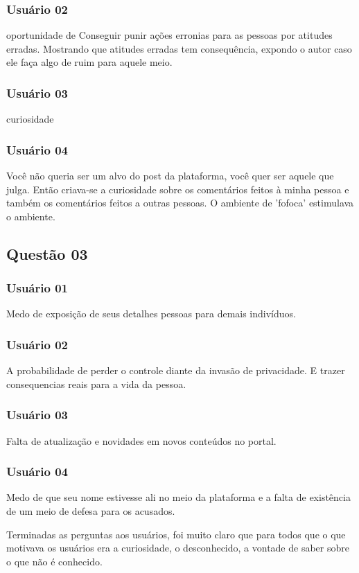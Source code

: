 \subsubsection{Usuário 02}
oportunidade de Conseguir punir ações erronias para as pessoas por atitudes erradas.
Mostrando que atitudes erradas tem consequência, expondo o autor caso ele faça
algo de ruim para aquele meio.
\subsubsection{Usuário 03}
curiosidade
\subsubsection{Usuário 04}
Você não queria ser um alvo do post da plataforma, você quer ser aquele que julga.
Então criava-se a curiosidade sobre os comentários feitos à minha pessoa e também
os comentários feitos a outras pessoas. O ambiente de 'fofoca' estimulava o ambiente.

\subsection{Questão 03}
\subsubsection{Usuário 01}
Medo de exposição de seus detalhes pessoas para demais indivíduos.
\subsubsection{Usuário 02}
A probabilidade de perder o controle diante da invasão de privacidade. E trazer
consequencias reais para a vida da pessoa.
\subsubsection{Usuário 03}
Falta de atualização e novidades em novos conteúdos no portal.
\subsubsection{Usuário 04}
Medo de que seu nome estivesse ali no meio da plataforma e a falta de existência
de um meio de defesa para os acusados.

Terminadas as perguntas aos usuários, foi muito claro que para todos que o que motivava
os usuários era a curiosidade, o desconhecido, a vontade de saber sobre o que
não é conhecido.

